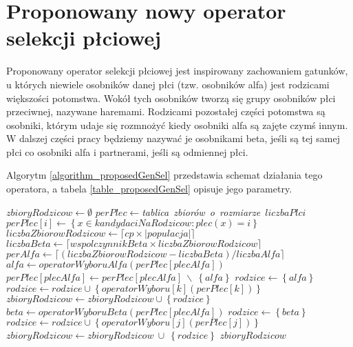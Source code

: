 \documentclass[twoside]{iisthesis}
\begin{document}
\section{Proponowany nowy operator selekcji płciowej} \label{section_proposedGenSel}

Proponowany operator selekcji płciowej jest inspirowany zachowaniem gatunków, u których niewiele osobników danej płci (tzw. osobników alfa) jest rodzicami większości potomstwa. Wokół tych osobników tworzą się grupy osobników płci przeciwnej, nazywane haremami. Rodzicami pozostałej części potomstwa są osobniki, którym udaje się rozmnożyć kiedy osobniki alfa są zajęte czymś innym. W dalszej części pracy będziemy nazywać je osobnikami beta, jeśli są tej samej płci co osobniki alfa i partnerami, jeśli są odmiennej płci.

Algorytm \ref{algorithm_proposedGenSel} przedstawia schemat działania tego operatora, a tabela \ref{table_proposedGenSel} opisuje jego parametry.

\begin{algorithm}
	\caption{Schemat działania haremowego operatora selekcji płciowej (opisywanego w rozdziale \ref{section_proposedGenSel})}
	\label{algorithm_proposedGenSel}
	\begin{algorithmic}[1]
		\Var $zbioryRodzicow \gets \emptyset$
		\Var $perPlec \gets $\textit{tablica\ zbiorów\ o\ rozmiarze\ }$liczbaPlci$
		\State $perPlec[i] \gets \left\{  x \in kandydaciNaRodzicow : plec(x) = i \right\}$
		\EndFor
		\Var $liczbaZbiorowRodzicow \gets \lceil cp \times |populacja| \rceil$
		\Var $liczbaBeta \gets \lceil wspolczynnikBeta \times liczbaZbiorowRodzicow \rceil$
		\Var $perAlfa \gets \lceil (liczbaZbiorowRodzicow-liczbaBeta)/liczbaAlfa \rceil$
		\Var $alfa \gets operatorWyboruAlfa(perPlec[plecAlfa])$
		\State $perPlec[plecAlfa] \gets perPlec[plecAlfa]\ \backslash\ \left\{ alfa \right\}$
		\Var $rodzice \gets \left\{ alfa \right\}$
		\State $rodzice \gets rodzice \cup \left\{ operatorWyboru[k](perPlec[k]) \right\}$
		\EndIf
		\EndFor
		\State $zbioryRodzicow \gets zbioryRodzicow \cup \left\{ rodzice \right\}$
		\EndFor
		\EndFor
		\Var $beta \gets operatorWyboruBeta(perPlec[plecAlfa])$
		\Var $rodzice \gets \left\{ beta \right\}$
		\State $rodzice \gets rodzice \cup \left\{ operatorWyboru[j](perPlec[j]) \right\}$
		\EndIf
		\EndFor
		\State $zbioryRodzicow \gets zbioryRodzicow\ \cup\ \left\{ rodzice \right\}$
		\EndFor
		\State \Return $zbioryRodzicow$
		\EndFunction
	\end{algorithmic}
\end{algorithm}
\end{document}
